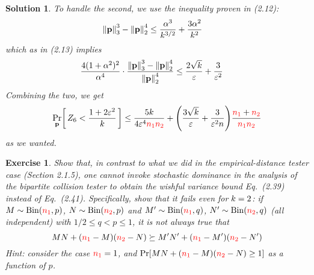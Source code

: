 \documentclass[biber,plain]{nowfnt} %
\newtheorem{question}{Exercise}[chapter]
\newtheorem{solution}{Solution}[chapter]
\newcommand{\nss}{\textcolor{red}{\ns_1}}
\newcommand{\nst}{\textcolor{red}{\ns_2}}
\newcommand{\nss}{\ns_1}
\newcommand{\nst}{\ns_2}
\begin{document}
\begin{solution}
    To handle the second, we use the inequality proven in (2.12):
    \begin{align*}
        \norm{\p}_3^3-\normtwo{\p}^4
        &\leq \frac{\alpha^{3}}{\ab^{3/2}} + \frac{3\alpha^2}{\ab^2}
    \end{align*}
    which as in (2.13) implies
    \begin{align*}
        \frac{4(1+\alpha^2)^2}{\alpha^4}\cdot \frac{\norm{\p}_3^3-\normtwo{\p}^4}{\normtwo{\p}^4}
        &\leq \frac{2\sqrt{\ab}}{\dst}+ \frac{3}{\dst^2}\,
    \end{align*}
    Combining the two, we get
    \[
        \probaDistrOf{\p}{ Z_6 < \frac{1+2\dst^2}{\ab} } \leq \frac{5\ab}{4\dst^4\nss\nst} + \Paren{\frac{3\sqrt{\ab}}{\dst} +\frac{3}{\dst^2\ns}}\frac{\nss+\nst}{\nss\nst}
    \]
    as we wanted.

\end{solution}
\begin{question}\label{ex:nomallet}
  Show that, in contrast to what we did in the empirical-distance tester case (Section 2.1.5), one cannot invoke stochastic dominance in the analysis of the bipartite collision tester to obtain the wishful variance bound Eq.~(2.39) instead of Eq.~(2.41). Specifically, show that it fails even for $k=2$: if $M\sim\binomial{\nss}{p}$, $N\sim\binomial{\nst}{p}$ and $M'\sim\binomial{\nss}{q}$, $N'\sim\binomial{\nst}{q}$ (all independent) with $1/2\leq q < p \leq 1$, it is \emph{not} always true that
  \[
      MN+(\nss-M)(\nst-N) \succeq M'N'+(\nss-M')(\nst-N')
  \]
  \emph{Hint: consider the case $\nss=1$, and $\bPr{MN+(\nss-M)(\nst-N)\geq 1}$ as a function of $p$.}
\end{question}
\end{document}
